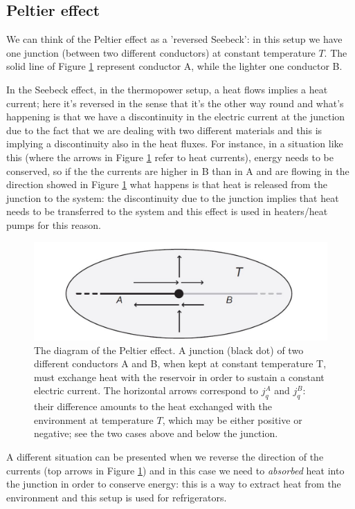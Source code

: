\documentclass[\main/main.tex]{subfiles}
\begin{document}
\subsection{Peltier effect}
We can think of the Peltier effect as a 'reversed Seebeck': in this setup we have one junction (between two different conductors) at constant temperature $T$. The solid line of Figure \ref{fig:peltier} represent conductor A, while the lighter one conductor B.

In the Seebeck effect, in the thermopower setup, a heat flows implies a heat current; here it's reversed in the sense that it's the other way round and what's happening is that we have a discontinuity in the electric current at the junction due to the fact that we are dealing with two different materials and this is implying a discontinuity also in the heat fluxes. For instance, in a situation like this (where the arrows in Figure \ref{fig:peltier} refer to heat currents), energy needs to be conserved, so if the the currents are higher in B than in A and are flowing in the direction showed in Figure \ref{fig:peltier} what happens is that heat is released from the junction to the system: the discontinuity due to the junction implies that heat needs to be transferred to the system and this effect is used in heaters/heat pumps for this reason. 

\begin{figure}[ht]
    \centering
    \includegraphics[width=0.7\linewidth]{Lectures/Images/peltier.jpg}
    \caption{The diagram of the Peltier effect. A junction (black dot) of two different conductors A and B, when kept at constant temperature T, must exchange heat with the reservoir in order to sustain a constant electric current. The horizontal arrows correspond to $j_q^A$ and $j_q^B$: their difference amounts to the heat exchanged with the environment at temperature $T$, which may be either positive or negative; see the two cases above and below the junction.}
    \label{fig:peltier}
\end{figure}

A different situation can be presented when we reverse the direction of the currents (top arrows in Figure \ref{fig:peltier}) and in this case we need to \textit{absorbed} heat into the junction in order to conserve energy: this is a way to extract heat from the environment and this setup is used for refrigerators. \\
\end{document}

